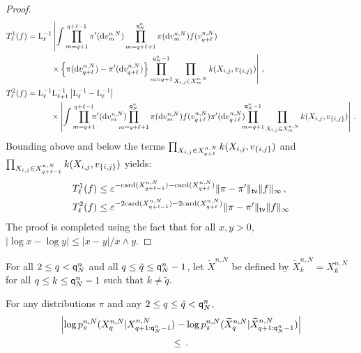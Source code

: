 \begin{proof}
\begin{align*}
T^1_{\ell}(f) &= \mathrm{L}_{\ell}^{-1}\left|\int \prod_{m=q+1}^{q+\ell-1}\pi'(\rmd v^{n,N}_m)\prod_{m=q+\ell+1}^{\ordermax{n}{N}}\pi(\rmd v^{n,N}_m)f(v_{q+\ell}^{n,N})\right.\\
&\hspace{1cm}\left.\times\left\{\pi(\rmd v_{q+\ell}^{n,N})-\pi'(\rmd v_{q+\ell}^{n,N})\right\}\prod_{m=q+1}^{\ordermax{n}{N}-1}\prod_{X_{i,j}\in X^{n,N}_m}\condlik(X_{i,j},v_{\{i,j\}})\right|\eqsp,\\
T^2_{\ell}(f) &= \mathrm{L}_{\ell}^{-1}\mathrm{L}_{\ell+1}^{-1}\left|\mathrm{L}_{\ell}^{-1}-\mathrm{L}_{\ell}^{-1}\right|\\
& \hspace{1cm}\times\left|\int \prod_{m=q+1}^{q+\ell-1}\hspace{-.2cm}\pi'(\rmd v^{n,N}_m)\hspace{-.4cm}\prod_{m=q+\ell+1}^{\ordermax{n}{N}}\pi(\rmd v^{n,N}_m)f(v_{q+\ell}^{n,N})\pi'(\rmd v_{q+\ell}^{n,N})\hspace{-.2cm}\prod_{m=q+1}^{\ordermax{n}{N}-1}\prod_{X_{i,j}\in X^{n,N}_m}\condlik(X_{i,j},v_{\{i,j\}})\right|\eqsp.
\end{align*}
Bounding above and below the terms $\prod_{X_{i,j}\in X^{n,N}_{q+\ell}}k(X_{i,j},v_{\{i,j\}})$ and $\prod_{X_{i,j}\in X^{n,N}_{q+\ell-1}}k(X_{i,j},v_{\{i,j\}})$ yields:
\begin{align*}
T^1_{\ell}(f)  &\le \varepsilon^{-\mathrm{card}(X^{n,N}_{q+\ell-1})-\mathrm{card}(X^{n,N}_{q+\ell})}\|\pi-\pi'\|_{\mathsf{tv}}\|f\|_{\infty}\,,\\
T^2_{\ell}(f)  &\le \varepsilon^{-2\mathrm{card}(X^{n,N}_{q+\ell-1})-2\mathrm{card}(X^{n,N}_{q+\ell})}\|\pi-\pi'\|_{\mathsf{tv}}\|f\|_{\infty}
\end{align*}
The proof is completed using the fact that 
for all $x,y>0$, $|\log x - \log y| \le |x-y|/x\wedge y$. 
\end{proof}
For all $2\le q< {\mathsf{q}}^{n}_{N}$ and all $q\le \tilde{q}\le {\mathsf{q}}^{n}_{N}-1$, let $\widetilde{X}^{n,N}$ be defined by $\widetilde{X}_k^{n,N} = X_k^{n,N}$ for all $q\le k\le {\mathsf{q}}^{n}_{N}-1$ such that $k\neq \tilde{q}$. 
\begin{lemma}
For any distributions $\pi$ and any $2\le q\le \tilde{q}<{\mathsf{q}}^{n}_{N}$,
\begin{multline*}
\left|\log p_{\pi}^{n,N}(X_{q}^{n,N}|X_{q+1:{\mathsf{q}}^{n}_{N}-1}^{n,N}) - \log p_{\pi}^{n,N}(\widetilde{X}_{q}^{n,N}|\widetilde{X}_{q+1:{\mathsf{q}}^{n}_{N}-1}^{n,N})\right| \\
\leq \,.
\end{multline*}
\end{lemma}
